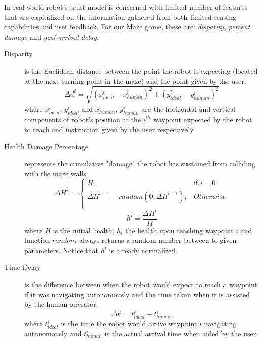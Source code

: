\documentclass{sig-alternate}
\begin{document}
 In real world robot's trust model is concerned with limited number of features that are capitalized on the information gathered from both limited sensing capabilities and user feedback. For our Maze game,
these are: \textit{disparity}, \textit{percent damage} and \textit{goal arrival
  delay}:

\begin{description}
  \item[Disparity] is the Euclidean distance between the point the
    robot is expecting (located at the next turning point in the maze)
    and the point given by the user.
  \begin{equation}
  \label{eq:disparity}
  \Delta d^i=\sqrt{(x_{ideal}^i-x_{human}^i)^2+(y_{ideal}^i-y_{human}^i)^2}
  \end{equation}
  where $x_{ideal}^i$, $y_{ideal}^i$ and $x_{human}^i$, $y_{human}^i$ are the horizontal and vertical
  components of robot's position at the $i^{th}$ waypoint expected by the robot to reach and instruction given by the user respectively.

  \item[Health Damage Percentage] represents the cumulative "damage"
    the robot has sustained from colliding with the maze walls.
\begin{equation}
  \label{eq:health_calc} 
\Delta H^i = 
\begin{cases}
H, & \text{if } i = 0\\
\Delta H^{i-1}-random(0,\Delta H^{i-1}), & Otherwise\\
\end{cases}
\end{equation}
\begin{equation}
\label{eq:health_calc_norm}
h^i = \dfrac{\Delta H^i}{H}
\end{equation}
  where $H$ is the initial health, $h_i$ the health upon reaching waypoint $i$ and function $random$ always returns a random number between to given parameters. Notice that $h^i$ is already normalized.
 
  \item[Time Delay] is the difference between when the robot would
    expect to reach a waypoint if it was navigating autonomously
    and the time taken when it is assisted by the human operator.
  \begin{equation}
  \label{eq:time_delay}
  \Delta t^i =t_{ideal}^i-t_{human}^i
  \end{equation}
  where $t_{ideal}^i$ is the time the robot would arrive waypoint $i$  navigating autonomously and $t_{human}^i$ is the actual arrival time when aided by the user.
\end{description}
\end{document}
